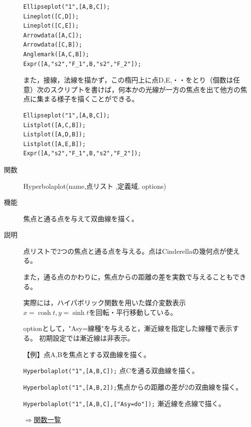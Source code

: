 \documentclass[papersize,a4paper,10pt,uplatex]{jsarticle}
\begin{document}
\begin{description}
\begin{verbatim}
Ellipseplot("1",[A,B,C]);
Lineplot([C,D]);
Lineplot([C,E]);
Arrowdata([A,C]);
Arrowdata([C,B]);
Anglemark([A,C,B]);
Expr([A,"s2","F_1",B,"s2","F_2"]);
\end{verbatim}
\vspace{\baselineskip}
\begin{center} \scalebox{0.9}{}\end{center}

また，接線，法線を描かず，この楕円上に点D,E,・・をとり（個数は任意）次のスクリプトを書けば，何本かの光線が一方の焦点を出て他方の焦点に集まる様子を描くことができる。

\begin{verbatim}
Ellipseplot("1",[A,B,C]);
Listplot([A,C,B]);
Listplot([A,D,B]);
Listplot([A,E,B]);
Expr([A,"s2","F_1",B,"s2","F_2"]);
\end{verbatim}

\begin{center} \scalebox{0.9}{} \end{center}


\hypertarget{hyperbolaplot}{}
\item[関数]Hyperbolaplot(name,点リスト ,定義域, options)
\item[機能]焦点と通る点を与えて双曲線を描く。
\item[説明]点リストで2つの焦点と通る点を与える。点はCinderellaの幾何点が使える。

また，通る点のかわりに，焦点からの距離の差を実数で与えることもできる。

実際には，ハイパボリック関数を用いた媒介変数表示 $x=\cosh t,y=\sinh t$を回転・平行移動している。

optionとして，"Asy=線種"を与えると，漸近線を指定した線種で表示する。 初期設定では漸近線は非表示。

\vspace{\baselineskip}
【例】点A,Bを焦点とする双曲線を描く。

\verb|Hyperbolaplot("1",[A,B,C]);| 点Cを通る双曲線を描く。

\verb|Hyperbolaplot("1",[A,B,2]);|焦点からの距離の差が2の双曲線を描く。

\verb|Hyperbolaplot("1",[A,B,C],["Asy=do"]);| 漸近線を点線で描く。

\vspace{\baselineskip}
\hspace{20mm} \scalebox{0.9}{}
\begin{flushright}\hyperlink{functionlist}{$\Rightarrow$関数一覧}\end{flushright}


\end{description}
\end{document}
